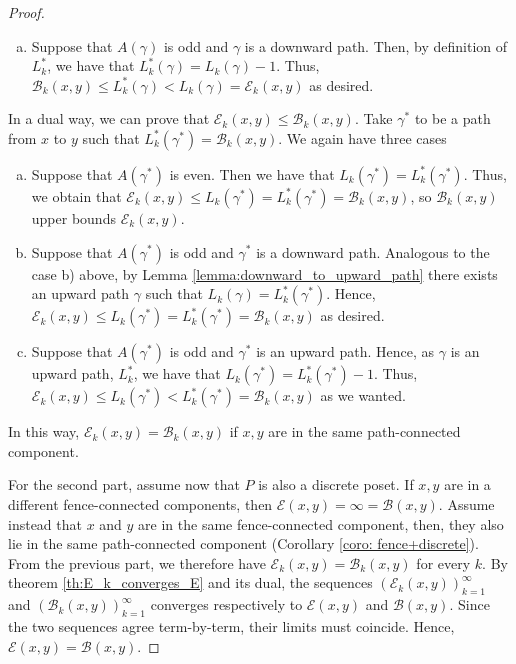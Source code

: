 \documentclass{article}[12pt]
\theoremstyle{exampstyle}
\theoremstyle{remark}
\newcommand{\B}{\mathcal{B}}
\newcommand{\E}{\mathcal{E}}
\begin{document}
\begin{proof}
\begin{enumerate}[a)]
        Hence, $\B_k(x,y) \leq L^*_k(\gamma) =  L_k(\gamma) =  \E_k(x,y)$. Thus, $\E_k(x,y)$ upper bounds $\B_k(x,y)$.

        \item Suppose that $A(\gamma)$ is odd and  $\gamma$ is a downward path. Then, by definition of $L^*_k$, we have that  $L^*_k(\gamma) =  L_k(\gamma) - 1$. Thus,  $\B_k(x,y) \leq L^*_k(\gamma) < L_k(\gamma) =  \E_k(x,y)$ as desired.
    \end{enumerate}

    In a dual way, we can prove that $\E_k(x,y) \leq \B_k(x,y)$. Take $\gamma^*$ to be a path from $x$ to $y$ such that $L^*_k(\gamma^*) = \B_{k}(x,y)$. We again have three cases
    \begin{enumerate}[a)]
        \item Suppose that $A(\gamma^*)$ is even. Then we have that  $L_k(\gamma^*) =  L^*_k(\gamma^*)$. Thus, we obtain that $\E_k(x,y) \leq L_k(\gamma^*) =  L^*_k(\gamma^*) = \B_k(x,y)$, so $\B_k(x,y)$ upper bounds $\E_k(x,y)$.
        
        \item Suppose that $A(\gamma^*)$ is odd and  $\gamma^*$ is a downward path. Analogous to the case b) above, by Lemma \ref{lemma:downward_to_upward_path} there exists an upward path $\gamma$ such that $L_k(\gamma) =  L^*_k(\gamma^*)$. Hence, $\E_k(x,y) \leq L_k(\gamma^*) =  L^*_k(\gamma^*) = \B_k(x,y)$ as desired.
        \item Suppose that $A(\gamma^*)$ is odd and $\gamma^*$ is an upward path. Hence, as $\gamma$ is an upward path,  $L^*_k$, we have that  $L_k(\gamma^*) =  L^*_k(\gamma^*) - 1$. Thus,  $\E_k(x,y) \leq L_k(\gamma^*) <  L^*_k(\gamma^*) = \B_k(x,y)$ as we wanted.        
    \end{enumerate}

    In this way, $\E_k(x,y) = \B_k(x,y)$ if $x,y$ are in the same path-connected component.

    For the second part, assume now that $P$ is also a discrete poset. If $x,y$ are in a different fence-connected components, then $\E(x,y) = \infty = \B(x,y)$. Assume instead that $x$ and $y$ are in the same fence-connected component, then, they also lie in the same path-connected component (Corollary \ref{coro: fence+discrete}). From the previous part, we therefore have $\E_k(x,y) = \B_k(x,y)$ for every $k$. By theorem \ref{th:E_k_converges_E} and its dual, the sequences $(\E_k(x,y))_{k=1}^\infty$ and $(\B_k(x,y))_{k=1}^\infty$ converges respectively to $\E(x,y) $ and $\B(x,y)$. Since the two sequences agree term-by-term, their limits must coincide. Hence, $\E(x,y) = \B(x,y)$.
\end{proof}
\end{document}
